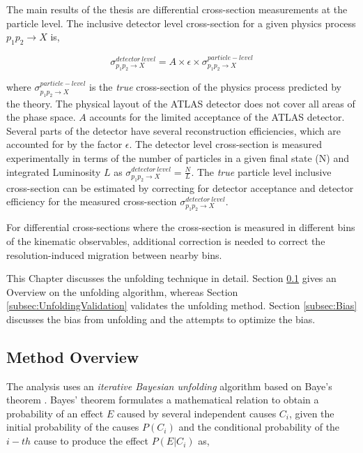 The main results of the thesis are differential cross-section measurements at the particle level. The inclusive detector level cross-section for a given physics process $p_{1}p_{2}\rightarrow X$ is, 

\begin{equation}
    \sigma ^{detector~level}_{p_{1}p_{2}\rightarrow X} = A \times \epsilon \times \sigma ^{particle-level}_{p_{1}p_{2}\rightarrow X}
    \label{eqn:InclusiveXS}
\end{equation}

where $\sigma ^{particle-level}_{p_{1}p_{2}\rightarrow X}$ is the \textit{true} cross-section of the physics process predicted by the theory. The physical layout of the ATLAS detector does not cover all areas of the phase space. $A$ accounts for the limited acceptance of the ATLAS detector. Several parts of the detector have several reconstruction efficiencies, which are accounted for by the factor $\epsilon$. The detector level cross-section is measured experimentally in terms of the number of particles in a given final state (N) and integrated Luminosity $L$ as $\sigma ^{detector~level}_{p_{1}p_{2}\rightarrow X} = \frac{N}{L}$. The \textit{true} particle level inclusive cross-section can be estimated by correcting for detector acceptance and detector efficiency for the measured cross-section $\sigma ^{detector~level}_{p_{1}p_{2}\rightarrow X}$.

For differential cross-sections where the cross-section is measured in different bins of the kinematic observables, additional correction is needed to correct the resolution-induced migration between nearby bins. 

This Chapter discusses the unfolding technique in detail. Section \ref{subsec:UnfoldingOverview} gives an Overview on the unfolding algorithm, whereas Section \ref{subsec:UnfoldingValidation} validates the unfolding method. Section \ref{subsec:Bias} discusses the bias from unfolding and the attempts to optimize the bias.  

\subsection{Method Overview}
\label{subsec:UnfoldingOverview}
The analysis uses an \textit{iterative Bayesian unfolding} algorithm based on Baye's theorem \cite{BayesianUnfolding}. Bayes' theorem formulates a mathematical relation to obtain a probability of an effect $E$ caused by several independent causes $C_{i}$, given the initial probability of the causes $P(C_{i})$ and the conditional probability of the $i-th$ cause to produce the effect $P(E|C_{i})$ as, 

